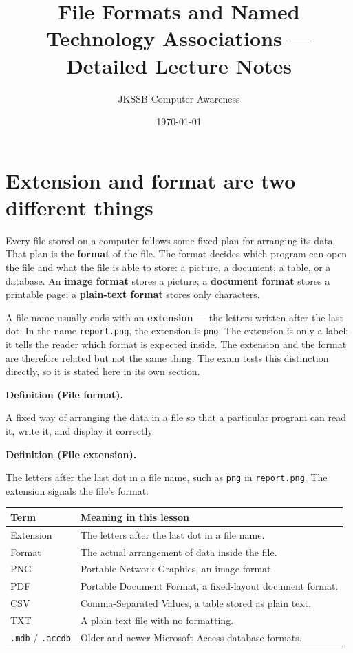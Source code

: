 \documentclass[11pt]{article}
\title{File Formats and Named Technology Associations --- Detailed Lecture Notes}
\author{JKSSB Computer Awareness}
\date{\today}
\newenvironment{definitionbox}[1]{%
  \par\noindent\textbf{Definition (#1).}\ \itshape
}{\par\vspace{0.3em}}
\begin{document}
\maketitle

\section{Extension and format are two different things}
Every file stored on a computer follows some fixed plan for arranging its
data. That plan is the \textbf{format} of the file. The format decides which
program can open the file and what the file is able to store: a picture, a
document, a table, or a database. An \textbf{image format} stores a picture;
a \textbf{document format} stores a printable page; a \textbf{plain-text
format} stores only characters.

A file name usually ends with an \textbf{extension} --- the letters written
after the last dot. In the name \texttt{report.png}, the extension is
\texttt{png}. The extension is only a label; it tells the reader which format
is expected inside. The extension and the format are therefore related but
not the same thing. The exam tests this distinction directly, so it is stated
here in its own section.

\begin{definitionbox}{File format}
A fixed way of arranging the data in a file so that a particular program can
read it, write it, and display it correctly.
\end{definitionbox}

\begin{definitionbox}{File extension}
The letters after the last dot in a file name, such as \texttt{png} in
\texttt{report.png}. The extension signals the file's format.
\end{definitionbox}

\begin{center}
\begin{tabular}{p{}p{}}
\toprule
\textbf{Term} & \textbf{Meaning in this lesson} \\
\midrule
Extension & The letters after the last dot in a file name. \\
Format & The actual arrangement of data inside the file. \\
PNG & Portable Network Graphics, an image format. \\
PDF & Portable Document Format, a fixed-layout document format. \\
CSV & Comma-Separated Values, a table stored as plain text. \\
TXT & A plain text file with no formatting. \\
\texttt{.mdb} / \texttt{.accdb} & Older and newer Microsoft Access database formats. \\
\bottomrule
\end{tabular}
\end{center}
\end{document}
